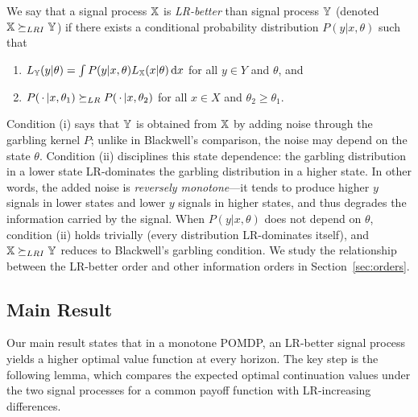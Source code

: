\begin{definition}\label{def:LRI}
We say that a signal process ${\mathbb{X}}$ is \emph{LR-better} than signal
process ${\mathbb{Y}}$ (denoted ${\mathbb{X}} \succeq_{LRI} {\mathbb{Y}}$) if there exists a conditional
probability distribution $P(y|x,\theta)$ such that
\begin{enumerate}
\item $L_{\mathbb{Y}}(y|\theta) = \int P(y|x,\theta) L_{\mathbb{X}}(x|\theta) \mathop{}\!\mathrm{d} x$
  for all $y \in Y$ and $\theta$, and
\item $P(\,\cdot\,|x,\theta_1) \succeq_{LR} P(\,\cdot\,|x,\theta_2)$ for all
  $x \in X$ and $\theta_2 \geq \theta_1$.
\end{enumerate}
\end{definition}


Condition (i) says that ${\mathbb{Y}}$ is obtained from ${\mathbb{X}}$ by adding noise
through the garbling kernel $P$; unlike in Blackwell's comparison, the
noise may depend on the state $\theta$. Condition (ii) disciplines this
state dependence: the garbling distribution in a lower state
LR-dominates the garbling distribution in a higher state. In other
words, the added noise is \emph{reversely monotone}---it tends to
produce higher $y$ signals in lower states and lower $y$ signals in
higher states, and thus degrades the information carried by the
signal. When $P(y|x,\theta)$ does not depend on $\theta$, condition
(ii) holds trivially (every distribution LR-dominates itself), and
${\mathbb{X}} \succeq_{LRI} {\mathbb{Y}}$ reduces to Blackwell's garbling condition. We study the
relationship between the LR-better order and other information orders
in Section~\ref{sec:orders}.

\subsection{Main Result}\label{sec:main-result}

Our main result states that in a monotone POMDP, an LR-better signal
process yields a higher optimal value function at every horizon. The
key step is the following lemma, which compares the expected optimal
continuation values under the two signal processes for a common payoff
function with LR-increasing differences.

